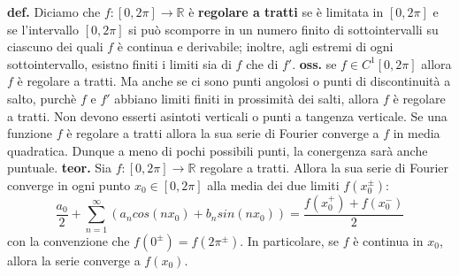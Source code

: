 \newline
\textbf{def.} Diciamo che $f : [0,2\pi] \rightarrow \mathbb{R}$ è \textbf{regolare a tratti} se è limitata in $[0,2\pi]$ e se l'intervallo $[0,2\pi]$ si può scomporre in un numero finito di sottointervalli su ciascuno dei quali $f$ è continua e derivabile; inoltre, agli estremi di ogni sottointervallo, esistno finiti i limiti sia di $f$ che di $f'$.\newline
\newline
\textbf{oss.} se $f \in C^1[0,2\pi]$ allora $f$ è regolare a tratti. Ma anche se ci sono punti angolosi o punti di discontinuità a salto, purchè $f$ e $f'$ abbiano limiti finiti in prossimità dei salti, allora $f$ è regolare a tratti. Non devono esserti asintoti verticali o punti a tangenza verticale.\newline
\newline
Se una funzione $f$ è regolare a tratti allora la sua serie di Fourier converge a $f$ in media quadratica. Dunque a meno di pochi possibili punti, la conergenza sarà anche puntuale.\newline
\newline
\textbf{teor.} Sia $f: [0,2\pi] \rightarrow \mathbb{R}$ regolare a tratti. Allora la sua serie di Fourier converge in ogni punto $x_0 \in [0,2\pi]$ alla media dei due limiti $f(x_0^{\pm})$:
\[
    \frac{a_0}{2} + \sum_{n=1}^{\infty} \left( a_n cos(nx_0) + b_n sin(nx_0) \right) = \frac{f(x_0^+) + f(x_0^-)}{2}
\]
con la convenzione che $f(0^\pm) = f(2\pi^\pm)$. In particolare, se $f$ è continua in $x_0$, allora la serie converge a $f(x_0)$.
